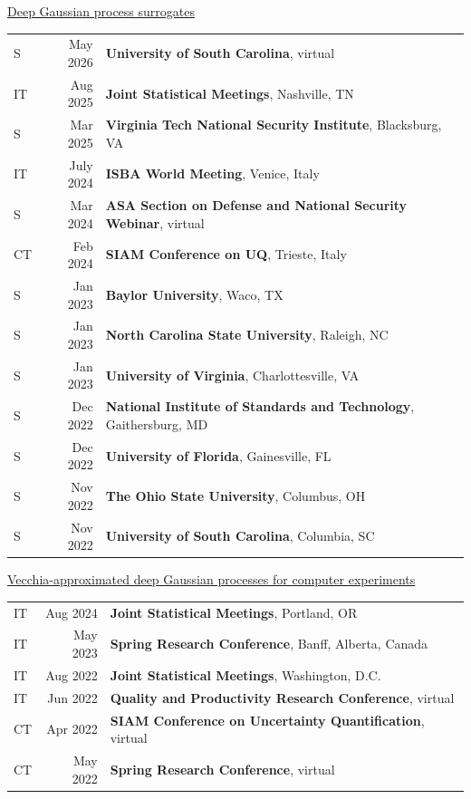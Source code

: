 \documentclass[margin,line,11pt]{res}
\begin{document}
\begin{resume}
\underline{Deep Gaussian process surrogates}\\
\begin{tabular}{lrl}
S\quad\quad & May 2026 & {\bf University of South Carolina}, virtual \\
IT\quad\quad & Aug 2025 & {\bf Joint Statistical Meetings}, Nashville, TN \\
S\quad\quad & Mar 2025 & {\bf Virginia Tech National Security Institute}, Blacksburg, VA \\
IT\quad\quad & July 2024 & {\bf ISBA World Meeting}, Venice, Italy \\
S\quad\quad & Mar 2024 & {\bf ASA Section on Defense and National Security Webinar}, virtual \\
CT\quad\quad & Feb 2024 & {\bf SIAM Conference on UQ}, Trieste, Italy \\
S\quad\quad & Jan 2023 & {\bf Baylor University}, Waco, TX \\
S\quad\quad & Jan 2023 & {\bf North Carolina State University}, Raleigh, NC \\
S\quad\quad & Jan 2023 & {\bf University of Virginia}, Charlottesville, VA \\
S\quad\quad & Dec 2022 & {\bf National Institute of Standards and Technology}, Gaithersburg, MD \\
S\quad\quad & Dec 2022 & {\bf University of Florida}, Gainesville, FL \\
S\quad\quad & Nov 2022 & {\bf The Ohio State University}, Columbus, OH \\
S\quad\quad & Nov 2022 & {\bf University of South Carolina}, Columbia, SC \\
\end{tabular}

\underline{Vecchia-approximated deep Gaussian processes for computer experiments}\\
\begin{tabular}{lrl}
IT & Aug 2024 & {\bf Joint Statistical Meetings}, Portland, OR \\
IT & May 2023 & {\bf Spring Research Conference}, Banff, Alberta, Canada \\
IT & Aug 2022 & {\bf Joint Statistical Meetings}, Washington, D.C. \\
IT & Jun 2022 & {\bf Quality and Productivity Research Conference}, virtual \\
CT & Apr 2022 & {\bf SIAM Conference on Uncertainty Quantification}, virtual \\
CT & May 2022 & {\bf Spring Research Conference}, virtual \\
\end{tabular}


\end{resume}
\end{document}
